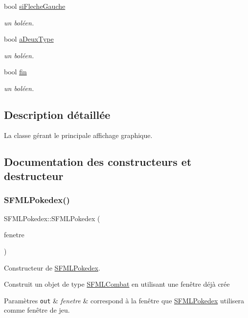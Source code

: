 \begin{DoxyCompactItemize}
bool \hyperlink{class_s_f_m_l_pokedex_a8c16438639f1b205188fbd00f04791bf}{si\+Fleche\+Gauche}
\begin{DoxyCompactList}\small\item\em un boléen. \end{DoxyCompactList}\item 
bool \hyperlink{class_s_f_m_l_pokedex_a4403115ebd1ffb08d990151197d53a29}{a\+Deux\+Type}
\begin{DoxyCompactList}\small\item\em un boléen. \end{DoxyCompactList}\item 
bool \hyperlink{class_s_f_m_l_pokedex_a773410b0979da4ed7a7792b80b0a7a99}{fin}
\begin{DoxyCompactList}\small\item\em un boléen. \end{DoxyCompactList}\end{DoxyCompactItemize}


\subsection{Description détaillée}
La classe gérant le principale affichage graphique. 

\subsection{Documentation des constructeurs et destructeur}
\mbox{\label{class_s_f_m_l_pokedex_a94d68bf080f6b2503fa8e867663a4b2b}} 
\subsubsection{\texorpdfstring{S\+F\+M\+L\+Pokedex()}{SFMLPokedex()}}
{\footnotesize\ttfamily S\+F\+M\+L\+Pokedex\+::\+S\+F\+M\+L\+Pokedex (\begin{DoxyParamCaption}\item[{sf\+::\+Render\+Window \&}]{fenetre }\end{DoxyParamCaption})}



Constructeur de \hyperlink{class_s_f_m_l_pokedex}{S\+F\+M\+L\+Pokedex}. 

Construit un objet de type \hyperlink{class_s_f_m_l_combat}{S\+F\+M\+L\+Combat} en utilisant une fenêtre déjà crée 
\begin{DoxyParams}[1]{Paramètres}
\mbox{\tt out}  & {\em fenetre} & correspond à la fenêtre que \hyperlink{class_s_f_m_l_pokedex}{S\+F\+M\+L\+Pokedex} utilisera comme fenêtre de jeu. \\
\hline
\end{DoxyParams}


